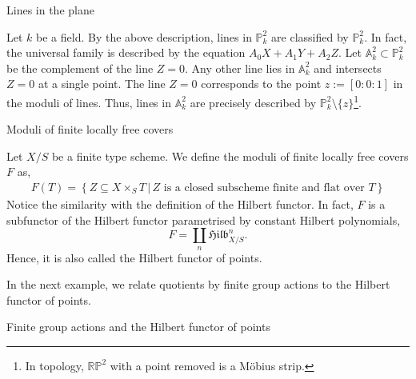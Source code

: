 \documentclass[ignorenonframetext,t]{beamer}
\newcommand{\A}{{\mathbb A}}
\renewcommand{\P}{{\mathbb P}}
\newcommand{\R}{{\mathbb R}}
\theoremstyle{definition}
\begin{document}
\begin{frame}
	Lines in the plane
\end{frame}
\begin{example}
	Let $k$ be a field. By the above description, lines in $\P_k^2$ are classified by $\P_k^2$. In fact, the universal family is described by the equation $A_0 X+A_1 Y + A_2 Z$. Let $\A_k^2\subset \P_k^2$ be the complement of the line $Z=0$. Any other line lies in $\A_k^2$ and intersects $Z=0$ at a single point. The line $Z=0$ corresponds to the point $z:=[0:0:1]$ in the moduli of lines. Thus, lines in $\A^2_k$ are precisely described by $\P^2_k \setminus \{z\}$\footnote{In topology, $\R\P^2$ with a point removed is a M\"{o}bius strip.}.
\end{example}

\begin{frame}
	Moduli of finite locally free covers
\end{frame}

\begin{example} 
	Let $X/S$ be a finite type scheme. We define the moduli of finite locally free covers $F$ as,
	\begin{align*}
	F(T)= \left\{
	Z \subseteq X\times_S T \,
	\left|\,\text{$Z$ is a closed subscheme finite and flat over $T$}\right.
	\right\}
	\end{align*}
	Notice the similarity with the definition of the Hilbert functor. In fact, $F$ is a subfunctor of the Hilbert functor parametrised by constant Hilbert polynomials,
	\[F=\underset{n}{\coprod}\mathfrak{Hilb}^n_{X/S}.\]
	Hence, it is also called the Hilbert functor of points.
\end{example}

In the next example, we relate quotients by finite group actions to the Hilbert functor of points.

\begin{frame}
	Finite group actions and the Hilbert functor of points
\end{frame}
\end{document}
